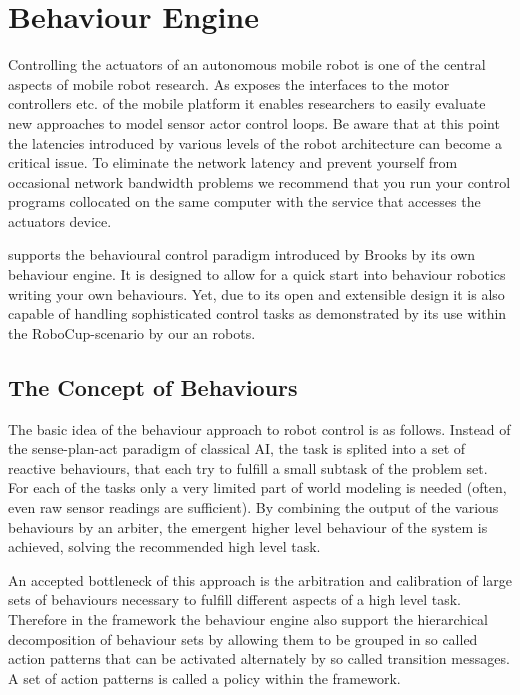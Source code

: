 \chapter{Behaviour Engine}
\label{SEC:BEHAVIOURS}

Controlling the actuators of an autonomous mobile robot is one of the
central aspects of mobile robot research. As \miro exposes the
interfaces to the motor controllers etc. of the mobile platform it
enables researchers to easily evaluate new approaches to model sensor
actor control loops. Be aware that at this point the latencies
introduced by various levels of the robot architecture can become a
critical issue. To eliminate the network latency and prevent yourself
from occasional network bandwidth problems we recommend that you run
your control programs collocated on the same computer with the service
that accesses the actuators device.

\miro supports the behavioural control paradigm introduced by Brooks
\cite{Brooks} by its own behaviour engine. It is designed to allow for
a quick start into behaviour robotics writing your own behaviours. Yet,
due to its open and extensible design it is also capable of handling
sophisticated control tasks as demonstrated by its use within the
RoboCup-scenario by our \sparrow an \sparrowIII robots.

\section{The Concept of Behaviours}

The basic idea of the behaviour approach to robot control is as
follows. Instead of the sense-plan-act paradigm of classical AI, the
task is splited into a set of reactive behaviours, that each try to
fulfill a small subtask of the problem set. For each of the tasks only
a very limited part of world modeling is needed (often, even raw
sensor readings are sufficient). By combining the output of the
various behaviours by an arbiter, the emergent higher level behaviour
of the system is achieved, solving the recommended high level task.

An accepted bottleneck of this approach is the arbitration and
calibration of large sets of behaviours necessary to fulfill different
aspects of a high level task. Therefore in the \miro framework the
behaviour engine also support the hierarchical decomposition of
behaviour sets by allowing them to be grouped in so called action
patterns that can be activated alternately by so called transition
messages. A set of action patterns is called a policy within the \miro
framework. 

